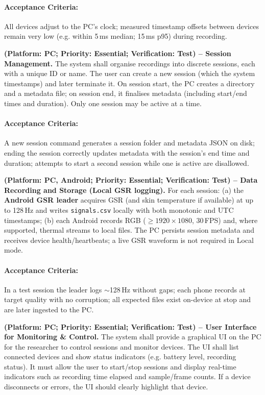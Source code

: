 \documentclass{report}
\begin{document}
\begin{description}[leftmargin=0cm]
        \paragraph{Acceptance Criteria:} All devices adjust to the PC’s clock; measured timestamp offsets between devices remain very low (e.g. within 5\,ms median; 15\,ms p95) during recording.

        \item \textbf{(Platform: PC; Priority: Essential; Verification: Test) – Session Management.} The system shall organise recordings into discrete sessions, each with a unique ID or name. The user can create a new session (which the system timestamps) and later terminate it. On session start, the PC creates a directory and a metadata file; on session end, it finalises metadata (including start/end times and duration). Only one session may be active at a time.
        \paragraph{Acceptance Criteria:} A new session command generates a session folder and metadata JSON on disk; ending the session correctly updates metadata with the session’s end time and duration; attempts to start a second session while one is active are disallowed.

        \item \textbf{(Platform: PC, Android; Priority: Essential; Verification: Test) – Data Recording and Storage (Local GSR logging).} For each session: (a) the \textbf{Android GSR leader} acquires GSR (and skin temperature if available) at up to 128\,Hz and writes \texttt{signals.csv} locally with both monotonic and UTC timestamps; (b) each Android records RGB ($\geq 1920{\times}1080$, 30\,FPS) and, where supported, thermal streams to local files. The PC persists session metadata and receives device health/heartbeats; a live GSR waveform is not required in Local mode.
        \paragraph{Acceptance Criteria:} In a test session the leader logs $\sim$128\,Hz without gaps; each phone records at target quality with no corruption; all expected files exist on-device at stop and are later ingested to the PC.

        \item \textbf{(Platform: PC; Priority: Essential; Verification: Test) – User Interface for Monitoring \& Control.} The system shall provide a graphical UI on the PC for the researcher to control sessions and monitor devices. The UI shall list connected devices and show status indicators (e.g. battery level, recording status). It must allow the user to start/stop sessions and display real-time indicators such as recording time elapsed and sample/frame counts. If a device disconnects or errors, the UI should clearly highlight that device.

\end{description}
\end{document}
